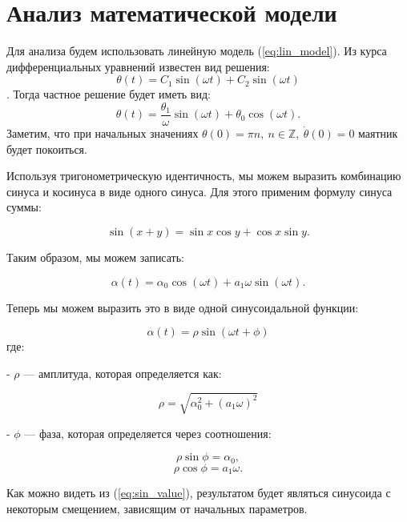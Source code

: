 \chapter{Анализ математической модели}
Для анализа будем использовать линейную модель (\ref{eq:lin_model}).
Из курса дифференциальных уравнений известен вид решения:
$$\theta(t) = C_1 \sin(\omega t) + C_2 \sin(\omega t)$$.
Тогда частное решение будет иметь вид:
$$\theta(t) = \frac{\theta_1}{\omega} \sin(\omega t) + \theta_0 \cos(\omega t).$$
Заметим, что при начальных значениях $\theta(0) = \pi n, \ n \in \mathbb{Z}, \ \dot{\theta}(0) = 0$ маятник будет покоиться.

Используя тригонометрическую идентичность, мы можем выразить комбинацию синуса и косинуса в виде одного синуса. Для этого применим формулу синуса суммы:

\[
\sin(x + y) = \sin x \cos y + \cos x \sin y.
\]

Таким образом, мы можем записать:

\[
\alpha(t) = \alpha_0 \cos(\omega t) + a_1 \omega \sin(\omega t).
\]

Теперь мы можем выразить это в виде одной синусоидальной функции:

\begin{equation}
	\alpha(t) = \rho \sin(\omega t + \phi)
	\label{eq:sin_value}
\end{equation}
где:

- \(\rho\) — амплитуда, которая определяется как:

\[
\rho = \sqrt{\alpha_0^2 + (a_1 \omega)^2}
\]

- \(\phi\) — фаза, которая определяется через соотношения:

\[
\rho \sin \phi = \alpha_0,
\]
\[
\rho \cos \phi = a_1 \omega.
\]

Как можно видеть из (\ref{eq:sin_value}), результатом будет являться синусоида с некоторым смещением, зависящим от начальных параметров.